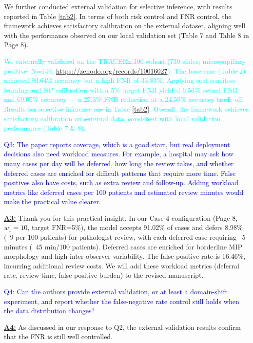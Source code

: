 \documentclass[UTF8,12pt]{article}
\begin{document}
We further conducted external validation for selective inference, with results reported in Table \ref{tab2}. In terms of both risk control and FNR control, the framework achieves satisfactory calibration on the external dataset, aligning well with the performance observed on our local validation set (Table 7 and Table 8 in Page 8).

\textcolor{cyan}{We externally validated on the TRACERx 100 cohort (739 slides; micropapillary positive, N=149, \url{https://zenodo.org/records/10016027}). The base case (Table 2) achieved 93.64\% accuracy but a high FNR of 33.83\%. Applying cost-sensitive learning and NP calibration with a 5\% target FNR yielded 6.53\% actual FNR and 69.05\% accuracy — a 27.3\% FNR reduction at a 24.59\% accuracy trade-off. Results for selective inference are in Table \ref{tab2}. Overall, the framework achieves satisfactory calibration on external data, consistent with local validation performance (Table 7 \& 8). }

\textcolor{blue}{Q3: The paper reports coverage, which is a good start, but real deployment decisions also need workload measures. For example, a hospital may ask how many cases per day will be deferred, how long the review takes, and whether deferred cases are enriched for difficult patterns that require more time. False positives also have costs, such as extra review and follow-up. Adding workload metrics like deferred cases per 100 patients and estimated review minutes would make the practical value clearer.}

\underline{{\bf A3:}} Thank you for this practical insight. In our Case 4 configuration (Page 8, $w_{1}=10$, target FNR=5\%), the model accepts 91.02\% of cases and defers 8.98\% (~9 per 100 patients) for pathologist review, with each deferred case requiring ~5 minutes (~45 min/100 patients). Deferred cases are enriched for borderline MIP morphology and high inter-observer variability. The false positive rate is 16.46\%, incurring additional review costs. We will add these workload metrics (deferral rate, review time, false positive burden) to the revised manuscript.

\textcolor{blue}{Q4: Can the authors provide external validation, or at least a domain-shift experiment, and report whether the false-negative rate control still holds when the data distribution changes?}

\underline{{\bf A4:}} As discussed in our response to Q2, the external validation results confirm that the FNR is still well controlled.
\end{document}
